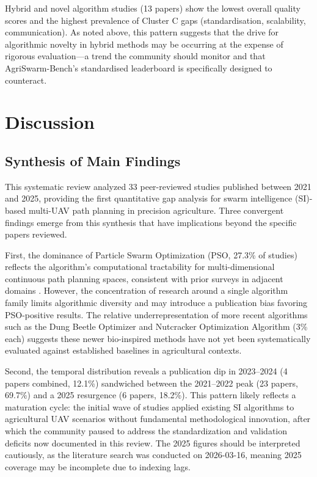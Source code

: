 \documentclass[review,3p,times]{elsarticle}
\begin{document}
Hybrid and novel algorithm studies (13 papers) show the lowest overall quality scores and the highest prevalence of Cluster C gaps (standardisation, scalability, communication). As noted above, this pattern suggests that the drive for algorithmic novelty in hybrid methods may be occurring at the expense of rigorous evaluation---a trend the community should monitor and that AgriSwarm-Bench's standardised leaderboard is specifically designed to counteract.


\section{Discussion}

\subsection{Synthesis of Main Findings}

This systematic review analyzed 33 peer-reviewed studies published between 2021 and 2025, providing the first quantitative gap analysis for swarm intelligence (SI)-based multi-UAV path planning in precision agriculture. Three convergent findings emerge from this synthesis that have implications beyond the specific papers reviewed.

First, the dominance of Particle Swarm Optimization (PSO, 27.3\% of studies) reflects the algorithm's computational tractability for multi-dimensional continuous path planning spaces, consistent with prior surveys in adjacent domains \cite{puente2022,sharma2022}. However, the concentration of research around a single algorithm family limits algorithmic diversity and may introduce a publication bias favoring PSO-positive results. The relative underrepresentation of more recent algorithms such as the Dung Beetle Optimizer \cite{li2023} and Nutcracker Optimization Algorithm \cite{xiao2025} (3\% each) suggests these newer bio-inspired methods have not yet been systematically evaluated against established baselines in agricultural contexts.

Second, the temporal distribution reveals a publication dip in 2023--2024 (4 papers combined, 12.1\%) sandwiched between the 2021--2022 peak (23 papers, 69.7\%) and a 2025 resurgence (6 papers, 18.2\%). This pattern likely reflects a maturation cycle: the initial wave of studies applied existing SI algorithms to agricultural UAV scenarios without fundamental methodological innovation, after which the community paused to address the standardization and validation deficits now documented in this review. The 2025 figures should be interpreted cautiously, as the literature search was conducted on 2026-03-16, meaning 2025 coverage may be incomplete due to indexing lags.
\end{document}
